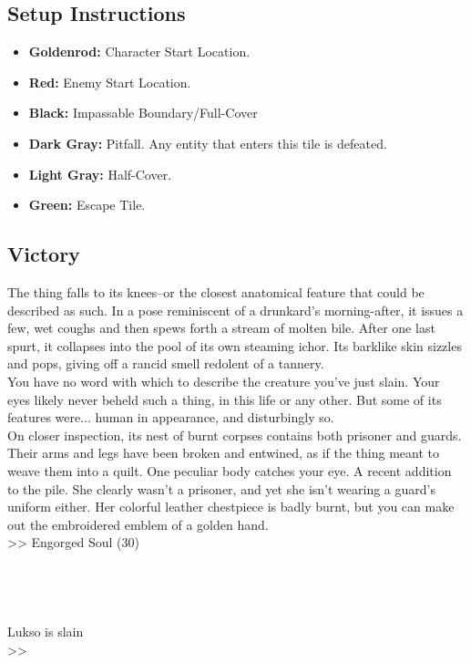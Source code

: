 \subsection*{Setup Instructions}
\begin{itemize}
\item \textbf{Goldenrod:} Character Start Location.
\item \textbf{Red:} Enemy Start Location.
\item \textbf{Black:} Impassable Boundary/Full-Cover
\item \textbf{Dark Gray:} Pitfall. Any entity that enters this tile is defeated.
\item \textbf{Light Gray:} Half-Cover.
\item \textbf{Green:} Escape Tile.
\end{itemize}

\pagebreak

\subsection*{Victory}
The thing falls to its knees--or the closest anatomical feature that could be described as such. In a pose reminiscent of a drunkard’s morning-after, it issues a few, wet coughs and then spews forth a stream of molten bile. After one last spurt, it collapses into the pool of its own steaming ichor. Its barklike skin sizzles and pops, giving off a rancid smell redolent of a tannery.\\

You have no word with which to describe the creature you’ve just slain. Your eyes likely never beheld such a thing, in this life or any other. But some of its features were... human in appearance, and disturbingly so.\\

On closer inspection, its nest of burnt corpses contains both prisoner and guards. Their arms and legs have been broken and entwined, as if the thing meant to weave them into a quilt. One peculiar body catches your eye. A recent addition to the pile. She clearly wasn’t a prisoner, and yet she isn't wearing a guard’s uniform either. Her colorful leather chestpiece is badly burnt, but you can make out the embroidered emblem of a golden hand.\\

>> Engorged Soul (30)\\
\\
\\
\\
\\
 Lukso is slain\\
>> 

